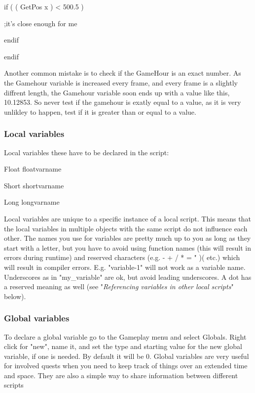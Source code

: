 \documentclass[
]{article}
\begin{document}
if ( ( GetPos x ) \textless{} 500.5 )

;it's close enough for me

endif

endif

\protect\hypertarget{_Toc182634499}{}{}

Another common mistake is to check if the GameHour is an exact number.
As the Gamehour variable is increased every frame, and every frame is a
slightly diffrent length, the Gamehour variable soon ends up with a
value like this, 10.12853. So never test if the gamehour is exatly equal
to a value, as it is very unlikley to happen, test if it is greater than
or equal to a value.

\hypertarget{local-variables}{%
\subsubsection{Local variables}\label{local-variables}}

Local variables these have to be declared in the script:

Float floatvarname

Short shortvarname

Long longvarname

Local variables are unique to a specific instance of a local script.
This means that the local variables in multiple objects with the same
script do not influence each other. The names you use for variables are
pretty much up to you as long as they start with a letter, but you have
to avoid using function names (this will result in errors during
runtime) and reserved characters (e.g. - + / * = " )( etc.) which will
result in compiler errors. E.g. "variable-1" will not work as a variable
name. Underscores as in "my\_variable" are ok, but avoid leading
underscores. A dot has a reserved meaning as well (see
"\emph{Referencing variables in other local scripts}" below).

\hypertarget{global-variables}{%
\subsubsection{Global variables}\label{global-variables}}

To declare a global variable go to the Gameplay menu and select Globals.
Right click for "new", name it, and set the type and starting value for
the new global variable, if one is needed. By default it will be 0.
Global variables are very useful for involved quests when you need to
keep track of things over an extended time and space. They are also a
simple way to share information between different scripts
\end{document}
